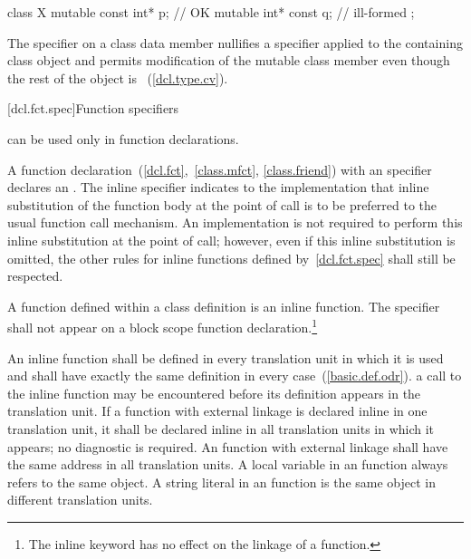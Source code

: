 \begin{codeblock}
class X {
	mutable const int* p;   // OK
	mutable int* const q;   // ill-formed
};
\end{codeblock}
\exitexampleb

\pnum
The  specifier on a class data member nullifies a
 specifier applied to the containing class object and
permits modification of the mutable class member even though the rest of
the object is ~(\ref{dcl.type.cv}).

[dcl.fct.spec]{Function specifiers}%
%

\pnum
{}
can be used only in function declarations.

\begin{bnf}
\br
    \br
    \br
\end{bnf}

\pnum
{}%
%
A function declaration~(\ref{dcl.fct},~\ref{class.mfct},
\ref{class.friend}) with an  specifier declares an
. The inline specifier indicates to
the implementation that inline substitution of the function body at the
point of call is to be preferred to the usual function call mechanism.
An implementation is not required to perform this inline substitution at
the point of call; however, even if this inline substitution is omitted,
the other rules for inline functions defined by~\ref{dcl.fct.spec} shall
still be respected.

\pnum
A function defined within a class definition is an inline function. The
 specifier shall not appear on a block scope function
declaration.\footnote{The inline keyword has no effect on the linkage of a function.}

\pnum
An inline function shall be defined in every translation unit in which
it is used and shall have exactly the same definition in every
case~(\ref{basic.def.odr}).
\enternote
a call to the inline function may be encountered before its definition
appears in the translation unit.
\exitnote
If a function with external linkage is declared inline in one translation
unit, it shall be declared inline in all translation units in which it
appears; no diagnostic is required. An  function with external
linkage shall have the same address in all translation units. A
 local variable in an  
function always refers to the same object. A string literal in an
  function is the same object in
different translation units.


